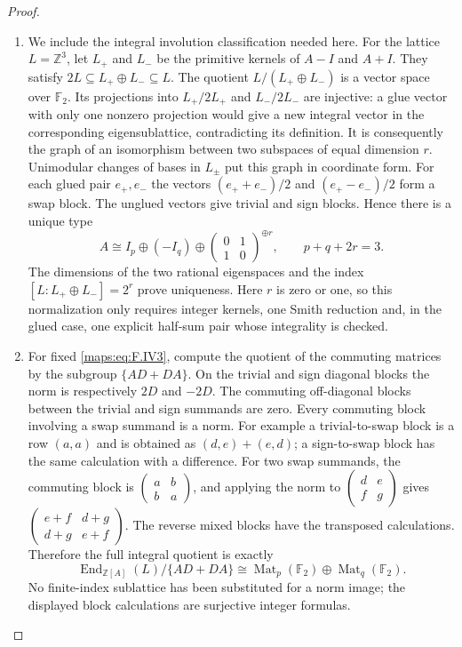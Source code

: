 \begin{proof}
\begin{enumerate}[label=\arabic*.]
\item We include the integral involution classification needed here.
For the lattice $L=\mathbb Z^3$, let $L_+$ and $L_-$ be the
primitive kernels of $A-I$ and $A+I$.  They satisfy
$2L\subseteq L_+\oplus L_-\subseteq L$.
The quotient $L/(L_+\oplus L_-)$ is a vector space over
$\mathbb F_2$.  Its projections into $L_+/2L_+$ and
$L_-/2L_-$ are injective: a glue vector with only one
nonzero projection would give a new integral vector in the
corresponding eigensublattice, contradicting its definition.
It is consequently the graph of an isomorphism between two
subspaces of equal dimension $r$.
Unimodular changes of bases in $L_\pm$ put this graph in
coordinate form.  For each glued pair $e_+,e_-$ the vectors
$(e_++e_-)/2$ and $(e_+-e_-)/2$ form a swap block.
The unglued vectors give trivial and sign blocks.  Hence
there is a unique type
\[
 A\cong I_p\oplus(-I_q)\oplus
 \begin{pmatrix}0&1\\1&0\end{pmatrix}^{\oplus r},
 \qquad p+q+2r=3.                                         \tag{F.IV3}\label{maps:eq:F.IV3}
\]
The dimensions of the two rational eigenspaces and the
index $[L:L_+\oplus L_-]=2^r$ prove uniqueness.
Here $r$ is zero or one, so this normalization only requires
integer kernels, one Smith reduction and, in the glued case,
one explicit half-sum pair whose integrality is checked.

\item For fixed \eqref{maps:eq:F.IV3}, compute the quotient of the commuting
matrices by the subgroup $\{AD+DA\}$.
On the trivial and sign diagonal blocks the norm is
respectively $2D$ and $-2D$.  The commuting off-diagonal
blocks between the trivial and sign summands are zero.
Every commuting block involving a swap summand is a norm.
For example a trivial-to-swap block is a row $(a,a)$ and
is obtained as $(d,e)+(e,d)$; a sign-to-swap block has the
same calculation with a difference.  For two swap summands,
the commuting block is
$\begin{pmatrix}a&b\\b&a\end{pmatrix}$, and applying the
norm to $\begin{pmatrix}d&e\\f&g\end{pmatrix}$ gives
$\begin{pmatrix}e+f&d+g\\d+g&e+f\end{pmatrix}$.
The reverse mixed blocks have the transposed calculations.
Therefore the full integral quotient is exactly
\[
 \operatorname{End}_{\mathbb Z[A]}(L)/\{AD+DA\}
 \cong \operatorname{Mat}_p(\mathbb F_2)
       \oplus\operatorname{Mat}_q(\mathbb F_2).             \tag{F.IV4}\label{maps:eq:F.IV4}
\]
No finite-index sublattice has been substituted for a norm
image; the displayed block calculations are surjective
integer formulas.


\end{enumerate}
\end{proof}
